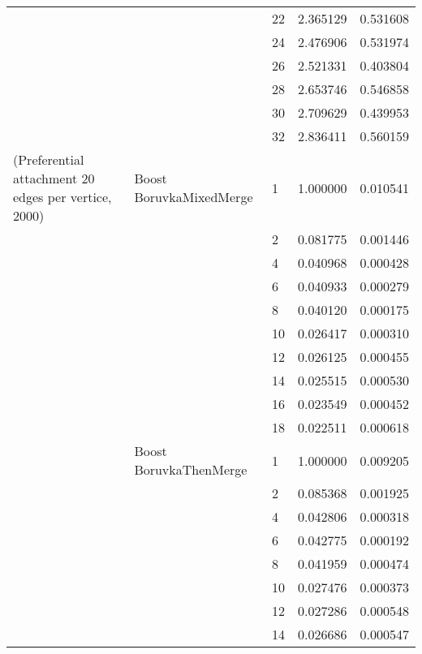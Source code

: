 \begin{tabular}{lllrr}
                      &            & 22 &  2.365129 &  0.531608 \\
                      &            & 24 &  2.476906 &  0.531974 \\
                      &            & 26 &  2.521331 &  0.403804 \\
                      &            & 28 &  2.653746 &  0.546858 \\
                      &            & 30 &  2.709629 &  0.439953 \\
                      &            & 32 &  2.836411 &  0.560159 \\
(Preferential attachment 20 edges per vertice, 2000) & Boost BoruvkaMixedMerge & 1  &  1.000000 &  0.010541 \\
                      &            & 2  &  0.081775 &  0.001446 \\
                      &            & 4  &  0.040968 &  0.000428 \\
                      &            & 6  &  0.040933 &  0.000279 \\
                      &            & 8  &  0.040120 &  0.000175 \\
                      &            & 10 &  0.026417 &  0.000310 \\
                      &            & 12 &  0.026125 &  0.000455 \\
                      &            & 14 &  0.025515 &  0.000530 \\
                      &            & 16 &  0.023549 &  0.000452 \\
                      &            & 18 &  0.022511 &  0.000618 \\
                      & Boost BoruvkaThenMerge & 1  &  1.000000 &  0.009205 \\
                      &            & 2  &  0.085368 &  0.001925 \\
                      &            & 4  &  0.042806 &  0.000318 \\
                      &            & 6  &  0.042775 &  0.000192 \\
                      &            & 8  &  0.041959 &  0.000474 \\
                      &            & 10 &  0.027476 &  0.000373 \\
                      &            & 12 &  0.027286 &  0.000548 \\
                      &            & 14 &  0.026686 &  0.000547 \\

\end{tabular}
